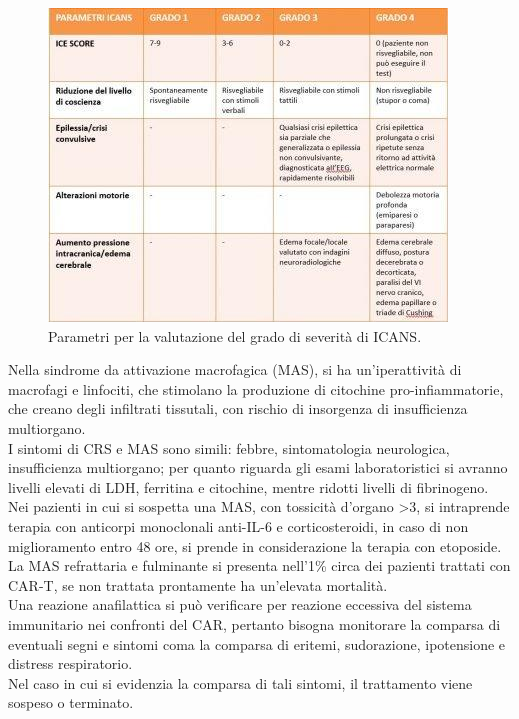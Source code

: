 \begin{figure}[H]
    \begin{center}
    \includegraphics[width=0.7\columnwidth]{img/ICANS.jpeg}
    \end{center}
    \caption[Parametri per la valutazione del grado di severità di ICANS.]{Parametri per la valutazione del grado di severità di ICANS.
    \cite{img27}}

\end{figure}

Nella sindrome da attivazione macrofagica (MAS), si ha un’iperattività di macrofagi e linfociti, che stimolano la 
produzione di citochine pro-infiammatorie, che creano degli infiltrati tissutali, con rischio di insorgenza di 
insufficienza multiorgano.\\
I sintomi di CRS e MAS sono simili: febbre, sintomatologia neurologica, insufficienza multiorgano; 
per quanto riguarda gli esami laboratoristici si avranno livelli elevati di LDH, ferritina e citochine, mentre 
ridotti livelli di fibrinogeno\cite{EMATOCART}.
Nei pazienti in cui si sospetta una MAS, con tossicità d’organo >3, si intraprende terapia con anticorpi monoclonali 
anti-IL-6 e corticosteroidi, in caso di non miglioramento entro 48 ore, 
si prende in considerazione la terapia con etoposide.\\
La MAS refrattaria e fulminante si presenta nell’1\% circa dei pazienti trattati con CAR-T, 
se non trattata prontamente ha un’elevata mortalità\cite{EMATOCART}.\\

Una reazione anafilattica si può verificare per reazione eccessiva del sistema immunitario nei confronti del CAR, 
pertanto bisogna monitorare la comparsa di eventuali segni e sintomi coma la comparsa di eritemi, 
sudorazione, ipotensione e distress respiratorio\cite{EMATOCART}.\\
Nel caso in cui si evidenzia la comparsa di tali sintomi, il trattamento viene sospeso o terminato\cite{Frontiers}.\\

